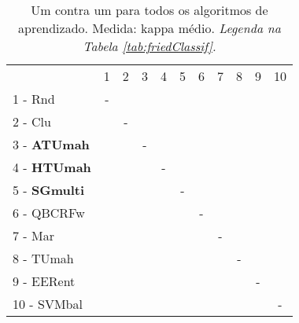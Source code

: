 \begin{table}[h]
\caption{Um contra um para todos os algoritmos de aprendizado. Medida: kappa médio. \textit{Legenda na Tabela \ref{tab:friedClassif}.}}
\begin{center}\begin{tabular}{lcc|cc|cc|cc|cc}
 			& 1 & 2 & 3 & 4 & 5 & 6 & 7 & 8 & 9 & 10\\
1 - Rnd  	& - &   &   &   &   &   &   &   &   &   \\
2 - Clu  	&   & - &   &   &   &   &   &   &   &   \\ \hline
3 - \textbf{ATUmah}	&   &   & - &   &   &   &   &   &   &   \\
4 - \textbf{HTUmah}	&   &   &   & - &   &   &   &   &   &   \\ \hline
5 - \textbf{SGmulti}	&   &   &   &   & - &   &   &   &   &   \\
6 - QBCRFw	&   &   &   &   &   & - &   &   &   &   \\ \hline
7 - Mar  	&   &   &   &   &   &   & - &   &   &   \\
8 - TUmah	&   &   &   &   &   &   &   & - &   &   \\ \hline
9 - EERent	&   &   &   &   &   &   &   &   & - &   \\
10 - SVMbal	&   &   &   &   &   &   &   &   &   & - \\ \hline\end{tabular}

\label{stratsALCKappaFriedAllRiscoall}
\end{center}
\end{table}